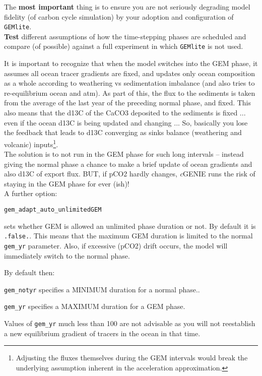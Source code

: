 \documentclass[10pt,twoside]{article}
\begin{document}
The \textbf{most important} thing is to ensure you are not seriously degrading model fidelity (of carbon cycle simulation) by your adoption and configuration of \texttt{GEMlite}.
\\\textbf{Test} different assumptions of how the time-stepping phases are scheduled and compare (of possible) against a full experiment in which \texttt{GEMlite} is not used.

It is important to recognize that when the model switches into the GEM phase, it assumes all ocean tracer gradients are fixed, and updates only ocean composition as a whole according to weathering vs sedimentation imbalance (and also tries to re-equilibrium ocean and atm). As part of this, the flux to the sediments is taken from the average of the last year of the preceding normal phase, and fixed. This also means that the d13C of the CaCO3 deposited to the sediments is fixed ... even if the ocean d13C is being updated and changing ... So, basically you lose the feedback that leads to d13C converging as sinks balance (weathering and volcanic) inputs\footnote{Adjusting the fluxes themselves during the GEM intervals would break the underlying assumption inherent in the acceleration approximation.}.
\\The solution is to not run in the GEM phase for such long intervals -- instead giving the normal phase a chance to make a brief update of ocean gradients and also d13C of export flux. BUT, if pCO2 hardly changes, \textit{c}GENIE runs the risk of staying in the GEM phase for ever (ish)!
\\ A further option:
\vspace{-5pt}\begin{verbatim}
gem_adapt_auto_unlimitedGEM
\end{verbatim}\vspace{-5pt}
sets whether GEM is allowed an unlimited phase duration or not. By default it is \texttt{.false.}. This means that the maximum GEM duration is limited to the normal \texttt{gem\_yr} parameter. Also, if excessive (pCO2) drift occurs, the model will immediately switch to the normal phase.

By default then:
\begin{compactitem}
	\item \texttt{gem\_notyr} specifies a MINIMUM duration for a normal phase..
	\item \texttt{gem\_yr} specifies a MAXIMUM duration for a GEM phase.
\end{compactitem}
Values of \texttt{gem\_yr} much less than 100 are not advisable as you will not reestablish a new equilibrium gradient of tracers in the ocean in that time.
\end{document}
